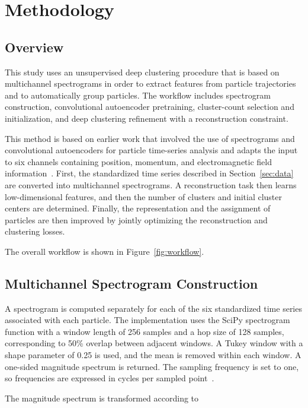\section{Methodology}\label{sec:methodology}

\subsection{Overview}

This study uses an unsupervised deep clustering procedure that is based on multichannel spectrograms in order to extract features from particle trajectories and to automatically group particles. The workflow includes spectrogram construction, convolutional autoencoder pretraining, cluster-count selection and initialization, and deep clustering refinement with a reconstruction constraint.

This method is based on earlier work that involved the use of spectrograms and convolutional autoencoders for particle time-series analysis and adapts the input to six channels containing position, momentum, and electromagnetic field information~\cite{moreiraReport}. First, the standardized time series described in Section~\ref{sec:data} are converted into multichannel spectrograms. A reconstruction task then learns low-dimensional features, and then the number of clusters and initial cluster centers are determined. Finally, the representation and the assignment of particles are then improved by jointly optimizing the reconstruction and clustering losses.

The overall workflow is shown in Figure~\ref{fig:workflow}.

\subsection{Multichannel Spectrogram Construction}

A spectrogram is computed separately for each of the six standardized time series associated with each particle. The implementation uses the SciPy spectrogram function with a window length of 256 samples and a hop size of 128 samples, corresponding to 50\% overlap between adjacent windows. A Tukey window with a shape parameter of 0.25 is used, and the mean is removed within each window. A one-sided magnitude spectrum is returned. The sampling frequency is set to one, so frequencies are expressed in cycles per sampled point~\cite{scipySpectrogram}.

The magnitude spectrum is transformed according to

